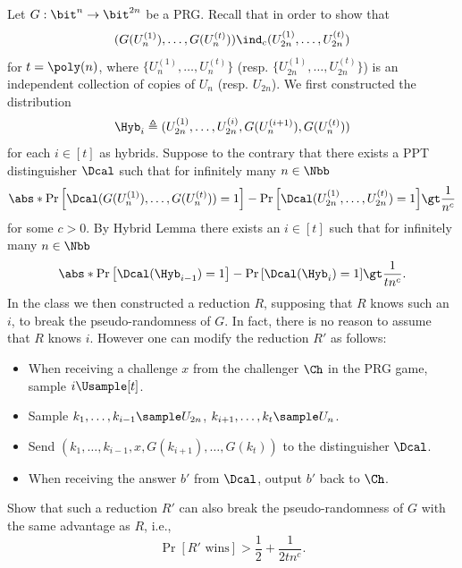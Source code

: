\begin{problem}\label{p5}
    \leavevmode\par
    Let $G:\bit^n\to\bit^{2n}$ be a PRG. Recall that in order to show that
    \[
        (G(U_n^{(1)}),\ldots, G(U_n^{(t)})) \ind_c (U_{2n}^{(1)},\ldots, U_{2n}^{(t)} )
    \]
    for $t = \poly(n)$, where $\{U_n^{(1)},\ldots, U_n^{(t)}\}$ (resp. $\{U_{2n}^{(1)},\ldots, U_{2n}^{(t)}\}$) is an independent collection of copies of $U_n$ (resp. $U_{2n}$). We first constructed the distribution
    \[
        \Hyb_i\triangleq (U_{2n}^{(1)},\ldots, U_{2n}^{(i)}, G(U_n^{(i+1)}), G(U_n^{(t)}))
    \]
    for each $i\in [t]$ as hybrids. Suppose to the contrary that there exists a PPT distinguisher $\Dcal$ such that for infinitely many $n\in\Nbb$
    \[
        \abs*{\Pr\left[   \Dcal(G(U_n^{(1)}),\ldots,G(U_n^{(t)}))  =1\right] - \Pr\left[ \Dcal(U_{2n}^{(1)},\ldots,U_{2n}^{(t)})  =1\right] }
        \gt \frac{1}{n^c}
    \]
    for some $c\gt 0$.
    By Hybrid Lemma there exists an $i\in [t]$ such that for infinitely many $n\in \Nbb$
    \[
        \abs*{\Pr\left[   \Dcal(\Hyb_{i-1})  =1\right] - \Pr\left[ \Dcal(\Hyb_i)  =1\right] }
        \gt \frac{1}{tn^c}.
    \]
    In the class we then constructed a reduction $R$, supposing that $R$ knows such an $i$, to break the pseudo-randomness of $G$.
    In fact, there is no reason to assume that $R$ knows $i$. However one can modify the reduction $R'$ as follows:
    \begin{itemize}[label=(\roman*)]
        \item When receiving a challenge $x$ from the challenger $\Ch$ in the PRG game, sample $i\Usample [t]$.
        \item Sample $k_1,\ldots,k_{i-1}\sample U_{2n}$, $k_{i+1},\ldots, k_t\sample U_n$.
        \item Send $(k_1,\ldots,k_{i-1},x,G(k_{i+1}),\ldots,  G(k_{t}))$ to the distinguisher $\Dcal$.
        \item When receiving the answer $b'$ from $\Dcal$, output $b'$ back to $\Ch$.
    \end{itemize}
    Show that such a reduction $R'$ can also break the pseudo-randomness of $G$ with the same advantage as $R$, i.e.,
    \[
        \Pr[R' \textrm{ wins}] \gt \frac{1}{2}+\frac{1}{2tn^c}.
    \]
\end{problem}


